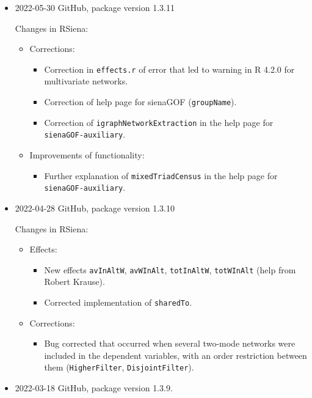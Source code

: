 \documentclass[a4paper,fleqn,11pt]{article}
\newcommand{\+}{\, + \,}
\begin{document}
\begin{small}
\begin{itemize}
\item 2022-05-30 GitHub, package version 1.3.11

Changes in RSiena:

\begin{itemize}
\item  Corrections:
\begin{itemize}
\item  Correction in  \texttt{effects.r} of error that led to warning
    in R 4.2.0 for multivariate networks.
\item  Correction of help page for  \textsf{sienaGOF} (\texttt{groupName}).
 \item  Correction of  \texttt{igraphNetworkExtraction} in the help page for
     \texttt{sienaGOF-auxiliary}.
\end{itemize}
\item  Improvements of functionality:
\begin{itemize}
\item  Further explanation of  \texttt{mixedTriadCensus} in the help page for
     \texttt{sienaGOF-auxiliary}.
\end{itemize}
\end{itemize}


\item 2022-04-28 GitHub, package version 1.3.10

Changes in RSiena:
\begin{itemize}
\item  Effects:
\begin{itemize}
  \item New effects  \texttt{avInAltW}, \texttt{avWInAlt}, \texttt{totInAltW}, \texttt{totWInAlt} (help from Robert Krause).
  \item Corrected implementation of \texttt{sharedTo}.
\end{itemize}
\item Corrections:
\begin{itemize}
  \item Bug corrected that occurred when several two-mode networks were included in the dependent variables, with an order restriction between them (\texttt{HigherFilter}, \texttt{DisjointFilter}).
\end{itemize}

\end{itemize}

\item 2022-03-18 GitHub, package version 1.3.9.


\end{itemize}
\end{small}
\end{document}
